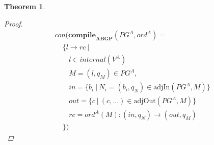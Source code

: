 \documentclass[twocolumn]{sig-alternate-10pt}
\newtheorem{thm}{Theorem}[section]
\begin{document}
\begin{thm}
\begin{proof}
    \[ \begin{array}{l}
       con(\textbf{compile}_\textbf{ABGP}(PG^A,ord^A) = \\
       ~~~~~ \{ l \rightarrow rc ~\vert \\
       ~~~~~~~~~ l \in internal(V^A) \\
       ~~~~~~~~~ M = (l,q_M) \in PG^A, \\
       ~~~~~~~~~ in = \{ b_i ~\vert~ N_i = (b_i,q_N) \in \text{adjIn}(PG^A,M) \} \\
       ~~~~~~~~~ out = \{ c ~\vert~ (c,\dots) \in \text{adjOut}(PG^A,M) \} \\
       ~~~~~~~~~ rc = ord^A(M) : (in,q_N) \rightarrow (out,q_M) \\
       ~~~~~ \})
    \end{array} \]%

  \end{proof}

\end{thm}
\end{document}
